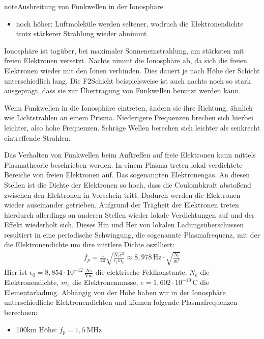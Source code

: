 \documentclass[letterpaper,10pt,english]{jupyterBook}
\begin{document}
\begin{sphinxadmonition}{note}{Ausbreitung von Funkwellen in der Ionosphäre}
\begin{itemize}
\item {} 
\sphinxAtStartPar
noch höher: Luftmoleküle werden seltener, wodruch die Elektronendichte trotz stärkerer Strahlung wieder abnimmt

\end{itemize}

\sphinxAtStartPar
Ionosphäre ist tagüber, bei maximaler Sonneneinstrahlung, am stärksten mit freien Elektronen versetzt. Nachts nimmt die  Ionosphäre ab, da sich die freien Elektronen wieder mit den Ionen verbinden. Dies dauert je nach Höhe der Schicht unterschiedlich lang. Die F2\sphinxhyphen{}Schicht beispielsweise ist auch nachts noch so stark ausgeprägt, dass sie zur Übertragung von Funkwellen benutzt werden kann.

\sphinxAtStartPar
Wenn Funkwellen in die Ionosphäre eintreten, ändern sie ihre Richtung, ähnlich wie Lichtstrahlen an einem Prisma. Niederigere Frequenzen brechen sich hierbei leichter, also hohe Frequenzen. Schräge Wellen berechen sich leichter als senkrecht eintreffende Strahlen.

\sphinxAtStartPar
Das Verhalten von Funkwellen beim Auftreffen auf freie Elektronen kann mittels Plasmatheorie beschrieben werden. In einem Plasma treten lokal verdichtete Bereiche von freien Elektronen auf. Das sogenannten Elektronengas. An diesen Stellen ist die Dichte der Elektronen so hoch, dass die Coulombkraft abstoßend zwischen den Elektronen in Vorschein tritt. Dadurch werden die Elektronen wieder auseinander getrieben. Aufgrund der Trägheit der Elektronen treten hierdurch allerdings an anderen Stellen wieder lokale Verdichtungen auf und der Effekt wiederholt sich. Dieses Hin und Her von lokalen Ladungsüberschussen resultiert in eine periodische Schwingung, die sogenannte Plasmafrequenz, mit der die Elektronendichte um ihre mittlere Dichte oszilliert:
\begin{equation*}
\begin{split}f_p = \frac{1}{2\pi}\sqrt{\frac{N_e e^2}{\epsilon_e m_e}} \approx 8,978\,\mathrm{Hz} \cdot \sqrt{\frac{N_e}{\mathrm{m^3}}}\end{split}
\end{equation*}
\sphinxAtStartPar
Hier ist \(\epsilon_0 = 8,854\cdot 10^{-12}\,\mathrm{\frac{As}{Vm}}\) die elektrische Feldkonstante, \(N_e\) die Elektronendichte, \(m_e\) die Elektronenmasse, \(e = 1,602\cdot 10^{-19}\,\mathrm{C}\) die Elementarladung. Abhängig von der Höhe haben wir in der Ionosphäre unterschiedliche Elektronendichten und können folgende Plasmafrequenzen berechnen:
\begin{itemize}
\item {} 
\sphinxAtStartPar
100km Höhe: \(f_p = 1,5\,\mathrm{MHz}\)


\end{itemize}
\end{sphinxadmonition}
\end{document}
